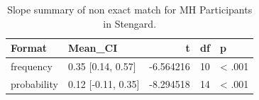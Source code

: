 \begin{table}
\centering
\caption{Slope summary of non exact match for MH Participants in Stengard.}
\centering
\fontsize{10}{12}\selectfont
\begin{tabular}[t]{llrrl}
\toprule
Format & Mean\_CI & t & df & p\\
\midrule
frequency & 0.35 [0.14, 0.57] & -6.564216 & 10 & < .001\\
probability & 0.12 [-0.11, 0.35] & -8.294518 & 14 & < .001\\
\bottomrule
\end{tabular}
\end{table}

